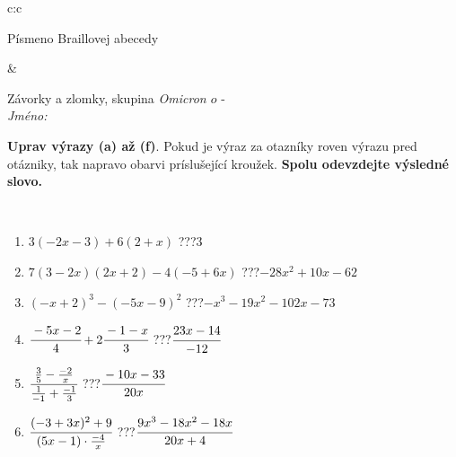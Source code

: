 \documentclass[10pt]{report}
\newcommand\omicron{o}
\begin{document}
\begin{tabular}{c:c}
\begin{minipage}[c][104.5mm][t]{0.5\linewidth}
\begin{center}
\begin{minipage}{0.20\linewidth}
\begin{center}
{\small Písmeno Braillovej abecedy}
\end{center}
\end{minipage}
\end{center}
\end{minipage}
&
\begin{minipage}[c][104.5mm][t]{0.5\linewidth}
\begin{center}
\vspace{7mm}
{\huge Závorky a zlomky, skupina \textit{Omicron $\omicron$} -}\\[5mm]
\textit{Jméno:}\phantom{xxxxxxxxxxxxxxxxxxxxxxxxxxxxxxxxxxxxxxxxxxxxxxxxxxxxxxxxxxxxxxxxx}\\[5mm]
\begin{minipage}{0.95\linewidth}
\begin{center}
\textbf{Uprav výrazy (a) až (f)}. Pokud je výraz za otazníky roven výrazu pred otázniky, tak napravo obarvi príslušející kroužek. \textbf{Spolu odevzdejte výsledné slovo.}
\end{center}
\end{minipage}
\\[1mm]
\begin{minipage}{0.79\linewidth}
\begin{center}
\begin{varwidth}{\linewidth}
\begin{enumerate}
\normalsize
\item $3(-2x-3)+6(2+x)$\quad \dotfill\; ???\;\dotfill \quad $3$
\item $7(3-2x)(2x+2)-4(-5+6x)$\quad \dotfill\; ???\;\dotfill \quad $-28x^2+10x-62$
\item $(-x+2)^3-(-5x-9)^2$\quad \dotfill\; ???\;\dotfill \quad $-x^3-19x^2-102x-73$
\item $\cfrac{-5x-2}{4}+2\cfrac{-1-x}{3}$\quad \dotfill\; ???\;\dotfill \quad $\cfrac{23x-14}{-12}$
\item $\cfrac{\frac{3}{5}-\frac{-2}{x}}{\frac{1}{-1}+\frac{-1}{3}}$\quad \dotfill\; ???\;\dotfill \quad $\cfrac{-10x-33}{20x}$
\item $\cfrac{(-3+3x)^2+9}{(5x-1)\cdot\frac{-4}{x}}$\quad \dotfill\; ???\;\dotfill \quad $\cfrac{9x^3-18x^2-18x}{20x+4}$
\end{enumerate}
\end{varwidth}
\end{center}
\end{minipage}
\begin{minipage}{0.20\linewidth}
\begin{center}

\end{center}
\end{minipage}
\end{center}
\end{minipage}
\end{tabular}
\end{document}
